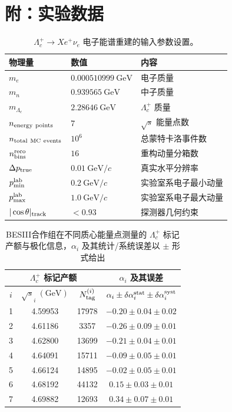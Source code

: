 \section{附：实验数据}
\begin{table}[htbp]
\centering
\renewcommand{\arraystretch}{1.15}
\begin{tabular}{lll}
\hline\hline
\textbf{物理量} & \textbf{数值} & \textbf{内容} \\
\hline
$m_e$ & $0.000510999~\mathrm{GeV}$ & 电子质量 \\
$m_n$ & $0.939565~\mathrm{GeV}$ & 中子质量 \\
$m_{\Lambda_c}$ & $2.28646~\mathrm{GeV}$ & $\Lambda_c^+$ 质量 \\
$n_{\rm energy\ points}$ & $7$ & $\sqrt{s}$ 能量点数 \\
$n_{\rm total\ MC\ events}$ & $10^6$ & 总蒙特卡洛事件数 \\
$n_{\rm bins}^{\rm reco}$ & $16$ & 重构动量分箱数 \\
$\Delta p_{\rm true}$ & $0.01~\mathrm{GeV}/c$ & 真实水平分辨率 \\
$p_{\min}^{\rm lab}$ & $0.2~\mathrm{GeV}/c$ & 实验室系电子最小动量 \\
$p_{\max}^{\rm lab}$ & $1.0~\mathrm{GeV}/c$ & 实验室系电子最大动量 \\
$|\cos\theta|_{\rm track}$ & $<0.93$ & 探测器几何约束 \\
\hline\hline
\end{tabular}
\caption{$\Lambda_c^+ \to X e^+ \nu_e$ 电子能谱重建的输入参数设置。}
\label{tab:input_parameters_lambdac_inclusive_sl}
\end{table}
\begin{table}[htbp]
\centering
\footnotesize
\setlength{\tabcolsep}{4pt}
\renewcommand{\arraystretch}{1.15}
\begin{tabular}{@{}cccc@{}}
\hline\hline
\multicolumn{3}{c}{$\Lambda_c^+$ 标记产额} & $\alpha_i$ 及其误差 \\
\hline
$i$ & $\sqrt{s}_i~(\mathrm{GeV})$ & $N_{\rm tag}^{(i)}$ & $\alpha_i \pm \delta\alpha_i^{\rm stat} \pm \delta\alpha_i^{\rm syst}$ \\
\hline
1 & 4.59953 & 17978 & $-0.20\pm0.04\pm0.02$ \\
2 & 4.61186 & 3357  & $-0.26\pm0.09\pm0.01$ \\
3 & 4.62800 & 13699 & $-0.21\pm0.04\pm0.01$ \\
4 & 4.64091 & 15711 & $-0.09\pm0.05\pm0.01$ \\
5 & 4.66124 & 14895 & $-0.02\pm0.05\pm0.01$ \\
6 & 4.68192 & 44132 & $0.15\pm0.03\pm0.01$ \\
7 & 4.69882 & 12693 & $0.34\pm0.07\pm0.01$ \\
\hline\hline
\end{tabular}
\caption{BESIII合作组在不同质心能量点测量的 $\Lambda_c^+$ 标记产额与极化信息，$\alpha_i$ 及其统计/系统误差以 $\pm$ 形式给出}
\label{tab:energy_points_alpha}
\end{table}
